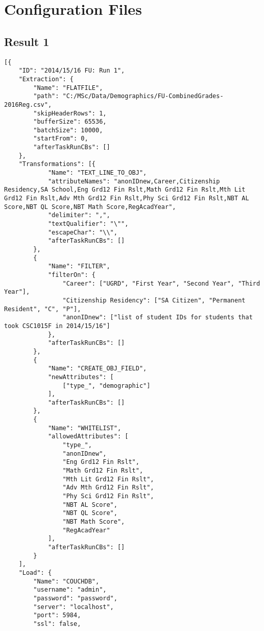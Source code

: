\section{Configuration Files}
\label{netl-configuration}

\subsection{Result 1}
\label{netl-run1-config}
\begin{verbatim}
[{
    "ID": "2014/15/16 FU: Run 1",
    "Extraction": {
        "Name": "FLATFILE",
        "path": "C:/MSc/Data/Demographics/FU-CombinedGrades-2016Reg.csv",
        "skipHeaderRows": 1,
        "bufferSize": 65536,
        "batchSize": 10000,
        "startFrom": 0,
        "afterTaskRunCBs": []
    },
    "Transformations": [{
            "Name": "TEXT_LINE_TO_OBJ",
            "attributeNames": "anonIDnew,Career,Citizenship Residency,SA School,Eng Grd12 Fin Rslt,Math Grd12 Fin Rslt,Mth Lit Grd12 Fin Rslt,Adv Mth Grd12 Fin Rslt,Phy Sci Grd12 Fin Rslt,NBT AL Score,NBT QL Score,NBT Math Score,RegAcadYear",
            "delimiter": ",",
            "textQualifier": "\"",
            "escapeChar": "\\",
            "afterTaskRunCBs": []
        },
        {
            "Name": "FILTER",
            "filterOn": {
                "Career": ["UGRD", "First Year", "Second Year", "Third Year"],
                "Citizenship Residency": ["SA Citizen", "Permanent Resident", "C", "P"],
                "anonIDnew": ["list of student IDs for students that took CSC1015F in 2014/15/16"]
            },
            "afterTaskRunCBs": []
        },
        {
            "Name": "CREATE_OBJ_FIELD",
            "newAttributes": [
                ["type_", "demographic"]
            ],
            "afterTaskRunCBs": []
        },
        {
            "Name": "WHITELIST",
            "allowedAttributes": [
                "type_",
                "anonIDnew",
                "Eng Grd12 Fin Rslt",
                "Math Grd12 Fin Rslt",
                "Mth Lit Grd12 Fin Rslt",
                "Adv Mth Grd12 Fin Rslt",
                "Phy Sci Grd12 Fin Rslt",
                "NBT AL Score",
                "NBT QL Score",
                "NBT Math Score",
                "RegAcadYear"
            ],
            "afterTaskRunCBs": []
        }
    ],
    "Load": {
        "Name": "COUCHDB",
        "username": "admin",
        "password": "password",
        "server": "localhost",
        "port": 5984,
        "ssl": false,

\end{verbatim}
